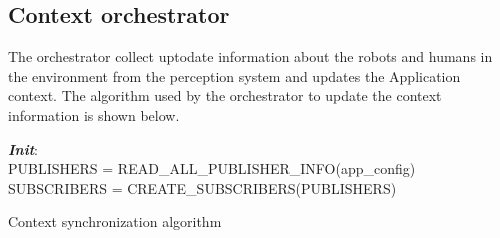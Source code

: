\subsection*{Context orchestrator} The orchestrator collect uptodate information about the robots and humans in the environment from the perception system and updates the Application context. The algorithm used by the orchestrator to update the context information is shown below.

\begin{algorithm}[H]
 \textbf{\emph{Init}}:\\
 \quad PUBLISHERS = READ\_ALL\_PUBLISHER\_INFO(app\_config)\;
 \quad SUBSCRIBERS = CREATE\_SUBSCRIBERS(PUBLISHERS)\;
 \caption{Context synchronization algorithm}
 \label{alg:context_sync}
\end{algorithm}
